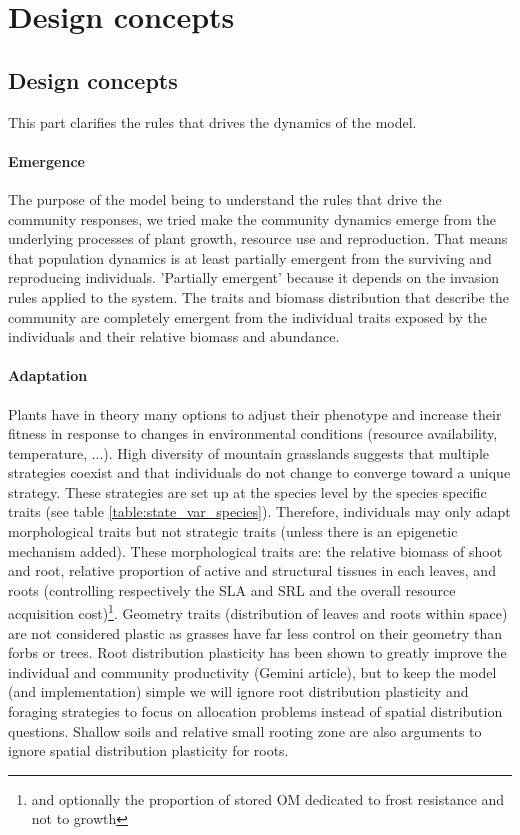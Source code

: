 \documentclass[a4paper,twoside, justified,marginals=raggedright, nobib]{tufte-handout}
\begin{document}
\section{Design concepts}

\subsection{Design concepts}
This part clarifies the rules that drives the dynamics of the model.

\paragraph{Emergence} The purpose of the model being to understand the rules that drive the community responses, we tried make the community dynamics emerge from the underlying processes of plant growth, resource use and reproduction. That means that population dynamics is at least partially emergent from the surviving and reproducing individuals. 'Partially emergent' because it depends on the invasion rules applied to the system. The traits and biomass distribution that describe the community are completely emergent from the individual traits exposed by the individuals and their relative biomass and abundance.

\paragraph{Adaptation} Plants have in theory many options to adjust their phenotype and increase their fitness in response to changes in environmental conditions (resource availability, temperature, ...). High diversity of mountain grasslands suggests that multiple strategies coexist and that individuals do not change to converge toward a unique strategy. These strategies are set up at the species level by the species specific traits (see table \ref{table:state_var_species}). Therefore, individuals may only adapt morphological traits but not strategic traits (unless there is an epigenetic mechanism added). These morphological traits are: the relative biomass of shoot and root, relative proportion of active and structural tissues in each leaves, and roots (controlling respectively the SLA and SRL and the overall resource acquisition cost)\footnote{and optionally the proportion of stored OM dedicated to frost resistance and not to growth}. Geometry traits (distribution of leaves and roots within space) are not considered plastic as grasses have far less control on their geometry than forbs or trees. Root distribution plasticity has been shown to greatly improve the individual and community productivity (Gemini article), but to keep the model (and implementation) simple we will ignore root distribution plasticity and foraging strategies to focus on allocation problems instead of spatial distribution questions. Shallow soils and relative small rooting zone are also arguments to ignore spatial distribution plasticity for roots.
\end{document}
